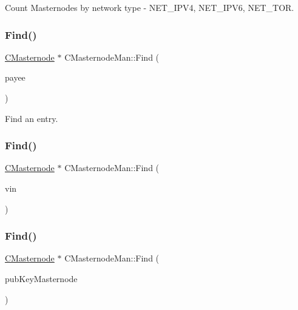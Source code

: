 Count Masternodes by network type -\/ N\+E\+T\+\_\+\+I\+P\+V4, N\+E\+T\+\_\+\+I\+P\+V6, N\+E\+T\+\_\+\+T\+OR. 

\mbox{\label{class_c_masternode_man_a3d34836c6992d29c485ba94a0c1e0ae6}} 
\subsubsection{\texorpdfstring{Find()}{Find()}\hspace{0.1cm}{\footnotesize\ttfamily [1/3]}}
{\footnotesize\ttfamily \mbox{\hyperlink{class_c_masternode}{C\+Masternode}} $\ast$ C\+Masternode\+Man\+::\+Find (\begin{DoxyParamCaption}\item[{const C\+Script \&}]{payee }\end{DoxyParamCaption})}



Find an entry. 

\mbox{\label{class_c_masternode_man_aade63e2fbea916e7051819015ef31dc5}} 
\subsubsection{\texorpdfstring{Find()}{Find()}\hspace{0.1cm}{\footnotesize\ttfamily [2/3]}}
{\footnotesize\ttfamily \mbox{\hyperlink{class_c_masternode}{C\+Masternode}} $\ast$ C\+Masternode\+Man\+::\+Find (\begin{DoxyParamCaption}\item[{const C\+Tx\+In \&}]{vin }\end{DoxyParamCaption})}

\mbox{\label{class_c_masternode_man_a2dddce0ba7602d92e5a7b18e28147d3c}} 
\subsubsection{\texorpdfstring{Find()}{Find()}\hspace{0.1cm}{\footnotesize\ttfamily [3/3]}}
{\footnotesize\ttfamily \mbox{\hyperlink{class_c_masternode}{C\+Masternode}} $\ast$ C\+Masternode\+Man\+::\+Find (\begin{DoxyParamCaption}\item[{const \mbox{\hyperlink{class_c_pub_key}{C\+Pub\+Key}} \&}]{pub\+Key\+Masternode }\end{DoxyParamCaption})}

